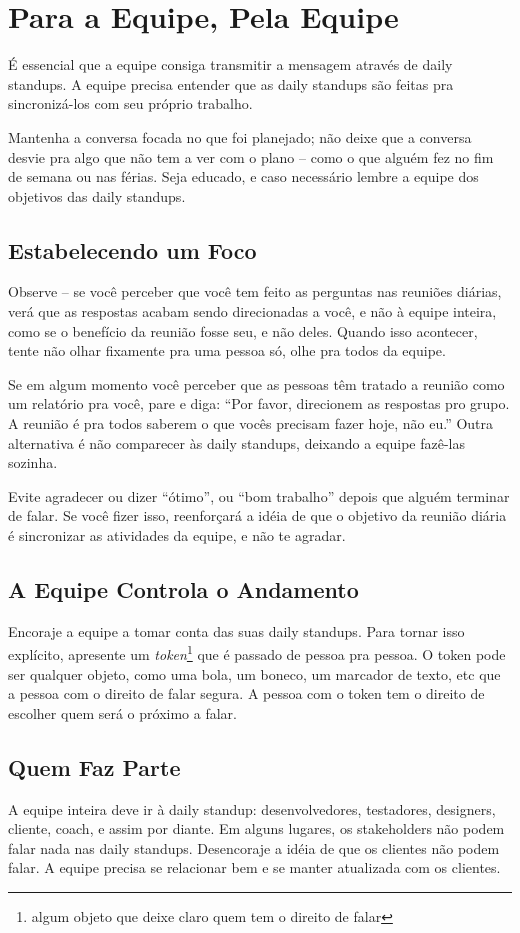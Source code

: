 \documentclass[a4paper, 10pt, font=plain]{abnt}
\begin{document}
\section{Para a Equipe, Pela Equipe}
É essencial que a equipe consiga transmitir a mensagem através de daily standups. A equipe precisa entender que as daily standups são feitas pra sincronizá-los com seu próprio trabalho.

Mantenha a conversa focada no que foi planejado; não deixe que a conversa desvie pra algo que não tem a ver com o plano -- como o que alguém fez no fim de semana ou nas férias. Seja educado, e caso necessário lembre a equipe dos objetivos das daily standups.


\subsection{Estabelecendo um Foco}
Observe -- se você perceber que você tem feito as perguntas nas reuniões diárias, verá que as respostas acabam sendo direcionadas a você, e não à equipe inteira, como se o benefício da reunião fosse seu, e não deles. Quando isso acontecer, tente não olhar fixamente pra uma pessoa só, olhe pra todos da equipe.

Se em algum momento você perceber que as pessoas têm tratado a reunião como um relatório pra você, pare e diga: ``Por favor, direcionem as respostas pro grupo. A reunião é pra todos saberem o que vocês precisam fazer hoje, não eu.'' Outra alternativa é não comparecer às daily standups, deixando a equipe fazê-las sozinha.

Evite agradecer ou dizer ``ótimo'', ou ``bom trabalho'' depois que alguém terminar de falar. Se você fizer isso, reenforçará a idéia de que o objetivo da reunião diária é sincronizar as atividades da equipe, e não te agradar.


\subsection{A Equipe Controla o Andamento}
Encoraje a equipe a tomar conta das suas daily standups. Para tornar isso explícito, apresente um \textit{token}\footnote{algum objeto que deixe claro quem tem o direito de falar} que é passado de pessoa pra pessoa. O token pode ser qualquer objeto, como uma bola, um boneco, um marcador de texto, etc que a pessoa com o direito de falar segura. A pessoa com o token tem o direito de escolher quem será o próximo a falar.


\subsection{Quem Faz Parte}
A equipe inteira deve ir à daily standup: desenvolvedores, testadores, designers, cliente, coach, e assim por diante. Em alguns lugares, os stakeholders não podem falar nada nas daily standups. Desencoraje a idéia de que os clientes não podem falar. A equipe precisa se relacionar bem e se manter atualizada com os clientes.
\end{document}
